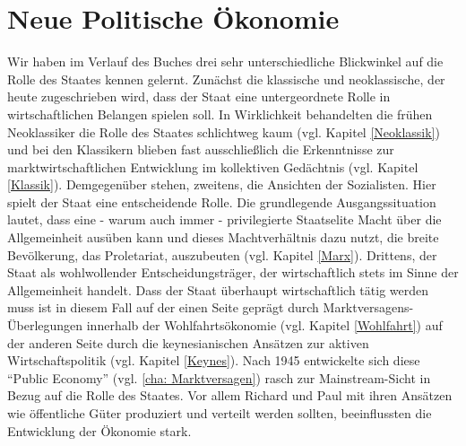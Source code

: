 %
%
%

\chapter{Neue Politische Ökonomie}
\label{Neue_Politik}

Wir haben im Verlauf des Buches drei sehr unterschiedliche Blickwinkel auf die Rolle des Staates kennen gelernt. Zunächst die klassische und neoklassische, der heute zugeschrieben wird, dass der Staat eine untergeordnete Rolle in wirtschaftlichen Belangen spielen soll. In Wirklichkeit behandelten die frühen Neoklassiker die Rolle des Staates schlichtweg kaum (vgl. Kapitel \ref{Neoklassik}) und bei den Klassikern blieben fast ausschließlich die Erkenntnisse zur marktwirtschaftlichen Entwicklung im kollektiven Gedächtnis (vgl. Kapitel \ref{Klassik}). Demgegenüber stehen, zweitens, die Ansichten der Sozialisten. Hier spielt der Staat eine entscheidende Rolle. Die grundlegende Ausgangssituation lautet, dass eine - warum auch immer - privilegierte Staatselite Macht über die Allgemeinheit ausüben kann und dieses Machtverhältnis dazu nutzt, die breite Bevölkerung, das Proletariat, auszubeuten (vgl. Kapitel \ref{Marx}). Drittens, der Staat als wohlwollender Entscheidungsträger, der wirtschaftlich stets im Sinne der Allgemeinheit handelt. Dass der Staat überhaupt wirtschaftlich tätig werden muss ist in diesem Fall auf der einen Seite geprägt durch Marktversagens-Überlegungen innerhalb der Wohlfahrtsökonomie (vgl. Kapitel \ref{Wohlfahrt}) auf der anderen Seite durch die keynesianischen Ansätzen zur aktiven Wirtschaftspolitik (vgl. Kapitel \ref{Keynes}). Nach 1945 entwickelte sich diese "`Public Economy"' (vgl. \ref{cha: Marktversagen}) rasch zur Mainstream-Sicht in Bezug auf die Rolle des Staates. Vor allem Richard \textcite{Musgrave1959} und Paul \textcite{Samuelson1954} mit ihren Ansätzen wie öffentliche Güter produziert und verteilt werden sollten, beeinflussten die Entwicklung der Ökonomie stark.

